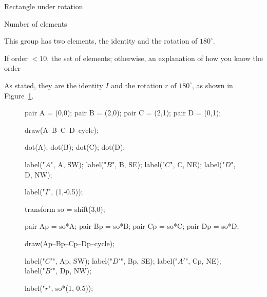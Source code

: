 \documentclass[../key.tex]{subfiles}
\begin{document}
\begin{outer_problem}
\item Rectangle under rotation
\end{outer_problem}

\begin{inner_problem}[start=1]
\item Number of elements
\end{inner_problem}

\noindent This group has two elements, the identity and the rotation of $180^\circ$.

\begin{inner_problem}
\item If order $< 10$, the set of elements; otherwise, an explanation of how you know the order
\end{inner_problem}

\noindent As stated, they are the identity $I$ and the rotation $r$ of $180^\circ$, as shown in Figure~\ref{fig:rect_rot}.

\begin{figure}[h]
	\begin{center}
		\begin{minipage}[b]{\textwidth}
			\centering
			\begin{asy}[width=0.5\textwidth]
			pair A = (0,0);
			pair B = (2,0);
			pair C = (2,1);
			pair D = (0,1);
			
			draw(A--B--C--D--cycle);
			
			dot(A);
			dot(B);
			dot(C);
			dot(D);
			
			label("$A$", A, SW);
			label("$B$", B, SE);
			label("$C$", C, NE);
			label("$D$", D, NW);
			
			label("$I$", (1,-0.5));
			
			transform so = shift(3,0);
			
			pair Ap = so*A;
			pair Bp = so*B;
			pair Cp = so*C;
			pair Dp = so*D;
			
			draw(Ap--Bp--Cp--Dp--cycle);
			
			label("$C'$", Ap, SW);
			label("$D'$", Bp, SE);
			label("$A'$", Cp, NE);
			label("$B'$", Dp, NW);
			
			label("$r$", so*(1,-0.5));
			\end{asy}
		\end{minipage}
	\end{center}
	\vspace*{-2\baselineskip}
	\begin{center}
		\begin{minipage}[t]{\textwidth}
			\label{fig:rect_rot}
		\end{minipage}
	\end{center}
	\vspace*{-2\baselineskip}
\end{figure}
\end{document}
